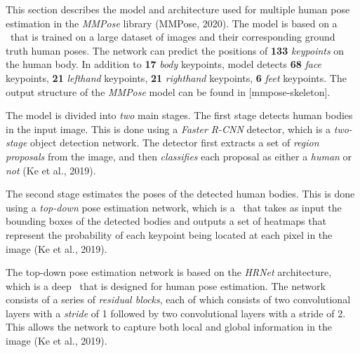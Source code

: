 
This section describes the model and architecture used for multiple human pose estimation in the {\em MMPose} library (\scc MMPose, 2020). The model is based on a \CNN\ that is trained on a large dataset of images and their corresponding ground truth human poses. The network can predict the positions of {\bf 133} {\em keypoints} on the human body. In addition to {\bf 17} {\em body} keypoints, model detects {\bf 68} {\em face} keypoints, {\bf 21} {\em lefthand} keypoints, {\bf 21} {\em righthand} keypoints, {\bf 6} {\em feet} keypoints. The output structure of the {\em MMPose} model can be found in [mmpose-skeleton].

The model is divided into {\em two} main stages. The first stage detects human bodies in the input image. This is done using a {\em Faster R-CNN} detector, which is a {\em two-stage} object detection network. The detector first extracts a set of {\em region proposals} from the image, and then {\em classifies} each proposal as either a {\em human} or {\em not} (\scc Ke et al., 2019).

The second stage estimates the poses of the detected human bodies. This is done using a {\em top-down} pose estimation network, which is a \CNN\ that takes as input the bounding boxes of the detected bodies and outputs a set of heatmaps that represent the probability of each keypoint being located at each pixel in the image (\scc Ke et al., 2019).

The top-down pose estimation network is based on the {\em HRNet} architecture, which is a deep \CNN\ that is designed for human pose estimation. The network consists of a series of {\em residual blocks}, each of which consists of two convolutional layers with a {\em stride} of 1 followed by two convolutional layers with a stride of 2. This allows the network to capture both local and global information in the image (\scc Ke et al., 2019).

